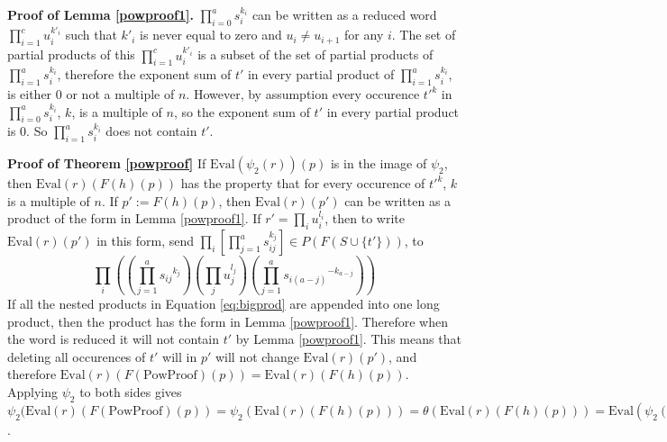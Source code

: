 \documentclass[11pt]{article} %
\theoremstyle{definition}
\theoremstyle{definition}
\theoremstyle{definition}
\theoremstyle{definition}
\theoremstyle{definition}
\theoremstyle{definition}
\begin{document}
\textbf{Proof of Lemma \ref{powproof1}.} $\prod_{i=0}^a s_i^{k_i}$ can be written as a reduced
word $\prod_{i = 1}^{c} u_i^{k'_i}$ such that $k'_i$ is never equal to zero and
$u_i \ne u_{i+1}$ for any $i$. The set of partial products of this
$\prod_{i = 1}^{c} u_i^{k'_i}$ is a subset of the set of partial products of $\prod_{i=1}^a s_i^{k_i}$,
therefore the exponent sum of $t'$ in every partial product of $\prod_{i=1}^a s_i^{k_i}$, is
either $0$ or not a multiple of $n$. However, by assumption every occurence $t'^k$ in
$\prod_{i=0}^a s_i^{k_i}$, $k$, is a multiple of $n$, so the exponent sum of $t'$ in every
partial product is $0$. So $\prod_{i=1}^a s_i^{k_i}$ does not contain $t'$.

\textbf{Proof of Theorem \ref{powproof}} \newline
If $\text{Eval}(\psi_2(r))(p)$ is in the image of $\psi_2$, then
$\text{Eval}(r)(F(h)(p))$ has the property
that for every occurence of $t'^k$, $k$ is a multiple of $n$.
If $p' := F(h)(p)$,
then $\text{Eval}(r)(p')$ can be written as a product of the form in
Lemma \ref{powproof1}.
If $r' = \prod_i u_i^{l_i}$, then to write $\text{Eval}(r)(p')$ in this
form, send $\prod_i \left[\prod_{j = 1}^a s_{ij}^{k_j}\right]
\in P(F(S \cup \{t'\}))$, to
\begin{equation} \label{eq:bigprod}
  \prod_i \left(\left(\prod_{j = 1}^a {s_{ij}}^{k_j}\right) \left(\prod_j u_j^{l_j}\right)
  \left(\prod_{j = 1}^a {s_{i(a - j)}}^{-k_{a - j}}\right)\right)
\end{equation}
If all the nested products in Equation \ref{eq:bigprod} are appended into one long product,
then the product has the form in Lemma \ref{powproof1}. Therefore when the word is reduced
it will not contain $t'$ by Lemma \ref{powproof1}. This means that deleting all occurences of
$t'$ will in $p'$ will not change $\text{Eval}(r)(p')$, and therefore
$\text{Eval}(r)(F(\text{PowProof})(p)) = \text{Eval}(r)(F(h)(p))$.
Applying $\psi_2$ to both sides gives
$\psi_2(\text{Eval}(r)(F(\text{PowProof})(p)) =
  \psi_2(\text{Eval}(r)(F(h)(p))) =
  \theta(\text{Eval}(r)(F(h)(p))) =
  \text{Eval}(\psi_2(r))(p)$.
\end{document}
